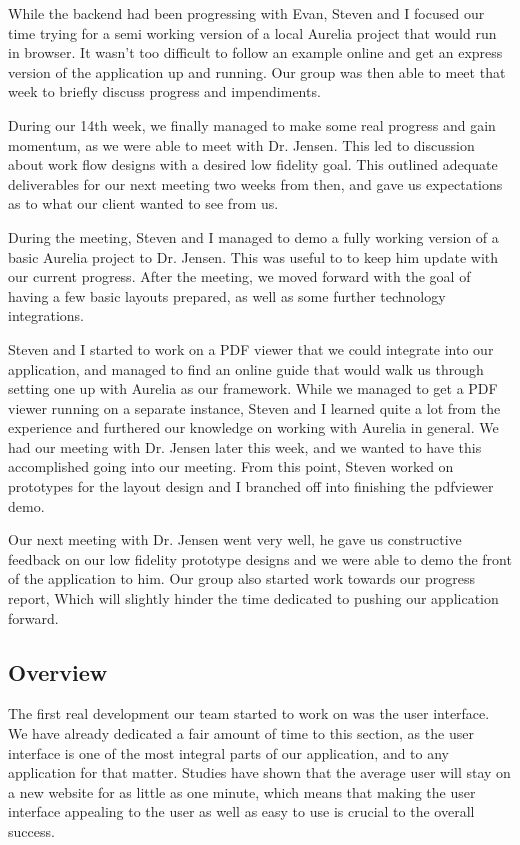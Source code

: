 \documentclass[onecolumn, draftclsnofoot,10pt, compsoc]{IEEEtran}
\begin{document}
While the backend had been progressing with Evan, Steven and I focused our time trying for
a semi working version of a local Aurelia project that would run in browser. It wasn't too
difficult to follow an example online and get an express version of the application up and
running. Our group was then able to meet that week to briefly discuss progress and
impendiments.

During our 14th week, we finally managed to make some real progress and gain momentum, as
we were able to meet with Dr. Jensen. This led to discussion about work flow designs with a
desired low fidelity goal. This outlined adequate deliverables for our next meeting two weeks
from then, and gave us expectations as to what our client wanted to see from us.

During the meeting, Steven and I managed to demo a fully working version of a basic Aurelia
project to Dr. Jensen. This was useful to to keep him update with our current progress. After
the meeting, we moved forward with the goal of having a few basic layouts prepared, as well
as some further technology integrations.

Steven and I started to work on a PDF viewer that we could integrate into our application,
and managed to find an online guide that would walk us through setting one up with Aurelia
as our framework. While we managed to get a PDF viewer running on a separate instance, Steven
and I learned quite a lot from the experience and furthered our knowledge on working with
Aurelia in general. We had our meeting with Dr. Jensen later this week, and we wanted to have
this accomplished going into our meeting. From this point, Steven worked on prototypes for
the layout design and I branched off into finishing the pdfviewer demo.

Our next meeting with Dr. Jensen went very well, he gave us constructive feedback on our low
fidelity prototype designs and we were able to demo the front of the application to him.
Our group also started work towards our progress report, Which will slightly hinder the time
dedicated to pushing our application forward.

\subsection{Overview}
The first real development our team started to work on was the user interface. We have already
dedicated a fair amount of time to this section, as the user interface is one of the most
integral parts of our application, and to any application for that matter. Studies have shown
that the average user will stay on a new website for as little as one minute, which means
that making the user interface appealing to the user as well as easy to use is crucial to the
overall success.
\end{document}
